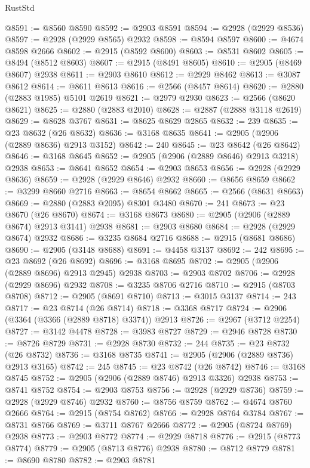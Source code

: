 \begin{lexlean}{RustStd}
\begin{coremodule}
{\begin{coremodule}
{{{{{{{{{{{{{{{{{{{{{{{{{{{{{{{{{{{{{{{{{{{{{{{{{{{{{{{{{{{{{{{{{{{{{{{{{{{{{{@8591 := @8560 @8590
@8592 := @2903 @8591
@8594 := @2928 (@2929 @8536)
@8597 := @2928 (@2929 @8565) @2932
@8598 := @8594 @8597
@8600 := @4674 @8598 @2666
@8602 := @2915 (@8592 @8600)
@8603 := @8531 @8602
@8605 := @8494 (@8512 @8603)
@8607 := @2915 (@8491 @8605)
@8610 := @2905 (@8469 @8607) @2938
@8611 := @2903 @8610
@8612 := @2929 @8462
@8613 := @3087 @8612
@8614 := @8611 @8613
@8616 := @2566 (@8457 @8614)
@8620 := @2880 (@2883 @1985) @5101 @2619
@8621 := @2979 @2930
@8623 := @2566 (@8620 @8621)
@8625 := @2880 (@2883 @2010)
@8628 := @2887 (@2888 @3118 @2619)
@8629 := @8628 @3767
@8631 := @8625 @8629 @2865
@8632 := 239
@8635 := @23 @8632 (@26 @8632)
@8636 := @3168 @8635
@8641 := @2905 (@2906 (@2889 @8636) @2913 @3152)
@8642 := 240
@8645 := @23 @8642 (@26 @8642)
@8646 := @3168 @8645
@8652 := @2905 (@2906 (@2889 @8646) @2913 @3218) @2938
@8653 := @8641 @8652
@8654 := @2903 @8653
@8656 := @2928 (@2929 @8636)
@8659 := @2928 (@2929 @8646) @2932
@8660 := @8656 @8659
@8662 := @3299 @8660 @2716
@8663 := @8654 @8662
@8665 := @2566 (@8631 @8663)
@8669 := @2880 (@2883 @2095) @8301 @3480
@8670 := 241
@8673 := @23 @8670 (@26 @8670)
@8674 := @3168 @8673
@8680 := @2905 (@2906 (@2889 @8674) @2913 @3141) @2938
@8681 := @2903 @8680
@8684 := @2928 (@2929 @8674) @2932
@8686 := @3235 @8684 @2716
@8688 := @2915 (@8681 @8686)
@8690 := @2905 (@3148 @8688)
@8691 := @4458 @3137
@8692 := 242
@8695 := @23 @8692 (@26 @8692)
@8696 := @3168 @8695
@8702 := @2905 (@2906 (@2889 @8696) @2913 @2945) @2938
@8703 := @2903 @8702
@8706 := @2928 (@2929 @8696) @2932
@8708 := @3235 @8706 @2716
@8710 := @2915 (@8703 @8708)
@8712 := @2905 (@8691 @8710)
@8713 := @3015 @3137
@8714 := 243
@8717 := @23 @8714 (@26 @8714)
@8718 := @3368 @8717
@8724 := @2906 (@3364 (@3366 (@2889 @8718) @3374)) @2913
@8726 := @2967 (@3712 @2254)
@8727 := @3142 @4478
@8728 := @3983 @8727
@8729 := @2946 @8728
@8730 := @8726 @8729
@8731 := @2928 @8730
@8732 := 244
@8735 := @23 @8732 (@26 @8732)
@8736 := @3168 @8735
@8741 := @2905 (@2906 (@2889 @8736) @2913 @3165)
@8742 := 245
@8745 := @23 @8742 (@26 @8742)
@8746 := @3168 @8745
@8752 := @2905 (@2906 (@2889 @8746) @2913 @3326) @2938
@8753 := @8741 @8752
@8754 := @2903 @8753
@8756 := @2928 (@2929 @8736)
@8759 := @2928 (@2929 @8746) @2932
@8760 := @8756 @8759
@8762 := @4674 @8760 @2666
@8764 := @2915 (@8754 @8762)
@8766 := @2928 @8764 @3784
@8767 := @8731 @8766
@8769 := @3711 @8767 @2666
@8772 := @2905 (@8724 @8769) @2938
@8773 := @2903 @8772
@8774 := @2929 @8718
@8776 := @2915 (@8773 @8774)
@8779 := @2905 (@8713 @8776) @2938
@8780 := @8712 @8779
@8781 := @8690 @8780
@8782 := @2903 @8781
}}}}}}}}}}}}}}}}}}}}}}}}}}}}}}}}}}}}}}}}}}}}}}}}}}}}}}}}}}}}}}}}}}}}}}}}}}}}}}
\end{coremodule}}
\end{coremodule}
\end{lexlean}
